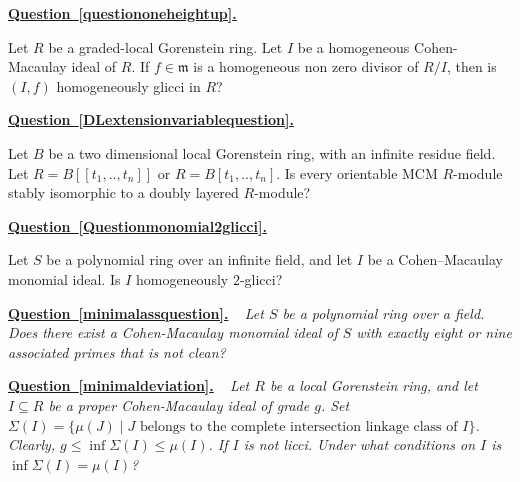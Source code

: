 \documentclass[11pt,letterpaper]{amsart}
\theoremstyle{plain}
\theoremstyle{definition}
\theoremstyle{remark}
\newenvironment{recalledquestion}[1]
{%
  \par\medskip
  \noindent
  \textbf{\hyperref[#1]{Question~\ref*{#1}.}}
  \ \itshape
}
{%
  \par\medskip
}
\begin{document}
\begin{recalledquestion}{questiononeheightup}
     Let $R$ be a graded-local Gorenstein ring. Let $I$ be a homogeneous Cohen-Macaulay ideal of $R$. If $f\in\mathfrak m$ is a homogeneous non zero divisor of $R/I$, then is $(I,f)$ homogeneously glicci in $R$?
\end{recalledquestion}

\begin{recalledquestion}{DLextensionvariablequestion}
     Let $B$ be a two dimensional local Gorenstein ring, with an infinite residue field. Let $R=B[[t_1,..,t_n]]$ or $R=B[t_1,..,t_n]$. Is every orientable MCM $R$-module stably isomorphic to a doubly layered $R$-module?
\end{recalledquestion}

\begin{recalledquestion}{Questionmonomial2glicci}
Let $S$ be a polynomial ring over an infinite field,
and let $I$ be a Cohen--Macaulay monomial ideal.
Is $I$ homogeneously $2$-glicci?
\end{recalledquestion}

\begin{recalledquestion}{minimalassquestion}Let $S$ be a polynomial ring over a field.
Does there exist a Cohen-Macaulay monomial ideal
of $S$ with exactly eight or nine associated
primes that is not clean?    
\end{recalledquestion}

\begin{recalledquestion}{minimaldeviation} Let $R$ be a local Gorenstein ring, and let $I\subseteq R$ be a proper Cohen-Macaulay ideal
of grade $g$. Set $\Sigma(I)=\{\mu(J)\mid J \text{ belongs to the
complete intersection linkage class of } I\}$. Clearly, $g\leq\inf\Sigma(I)\leq\mu(I)$. If $I$ is not licci. Under what conditions on $I$ is $\inf\Sigma(I)=\mu(I)$? 
\end{recalledquestion}





\end{document}
